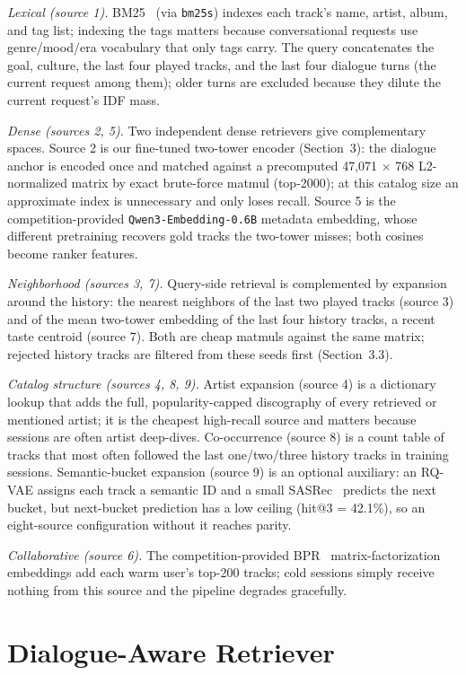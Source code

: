 \documentclass[sigconf]{acmart}
\begin{document}
\emph{Lexical (source 1).} BM25~\cite{bm25} (via \texttt{bm25s}) indexes each track's name, artist, album,
and tag list; indexing the tags matters because conversational requests use
genre/mood/era vocabulary that only tags carry. The query concatenates the goal,
culture, the last four played tracks, and the last four dialogue turns (the
current request among them); older turns are excluded because they dilute the
current request's IDF mass.

\emph{Dense (sources 2, 5).} Two independent dense retrievers give complementary
spaces. Source 2 is our fine-tuned two-tower encoder (Section~3): the dialogue
anchor is encoded once and matched against a precomputed 47,071 $\times$ 768
L2-normalized matrix by exact brute-force matmul (top-2000); at this catalog size
an approximate index is unnecessary and only loses recall. Source 5 is the
competition-provided \texttt{Qwen3-Embedding-0.6B} metadata embedding, whose different
pretraining recovers gold tracks the two-tower misses; both cosines become ranker
features.

\emph{Neighborhood (sources 3, 7).} Query-side retrieval is complemented by expansion
around the history: the nearest neighbors of the last two played tracks (source 3)
and of the mean two-tower embedding of the last four history tracks, a recent
taste centroid (source 7). Both are cheap matmuls against the same matrix; rejected history tracks
are filtered from these seeds first (Section~3.3).

\emph{Catalog structure (sources 4, 8, 9).} Artist expansion (source 4) is a
dictionary lookup that adds the full, popularity-capped discography of every
retrieved or mentioned artist; it is the cheapest high-recall source and matters
because sessions are often artist deep-dives. Co-occurrence (source 8) is a count
table of tracks that most often followed the last one/two/three history tracks in
training sessions. Semantic-bucket expansion (source 9) is an optional auxiliary:
an RQ-VAE assigns each track a semantic ID and a small SASRec~\cite{sasrec} predicts the next
bucket, but next-bucket prediction has a low ceiling (hit@3 = 42.1\%), so an
eight-source configuration without it reaches parity.

\emph{Collaborative (source 6).} The competition-provided BPR~\cite{bpr} matrix-factorization
embeddings add each warm user's top-200 tracks; cold sessions simply receive nothing from this source and the
pipeline degrades gracefully.

\section{Dialogue-Aware Retriever}
\end{document}
